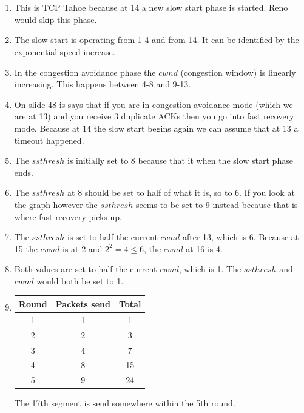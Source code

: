 \documentclass[12pt, a4paper]{article}
\begin{document}
\section{} %
\begin{enumerate}[a]
	\item %
	This is TCP Tahoe because at 14 a new slow start phase is started. Reno would skip this phase.
	\item %
	The slow start is operating from 1-4 and from 14. It can be identified by the exponential speed increase.
	\item %
	In the congestion avoidance phase the $cwnd$ (congestion window) is linearly increasing. This happens between 4-8 and 9-13.
	\item %
	On slide 48 is says that if you are in congestion avoidance mode (which we are at 13) and you receive 3 duplicate ACKs then you go into fast recovery mode. Because at 14 the slow start begins again we can assume that at 13 a timeout happened.
	\item %
	The $ssthresh$ is initially set to 8 because that it when the slow start phase ends.
	\item %
	The $ssthresh$ at 8 should be set to half of what it is, so to 6. If you look at the graph however the $ssthresh$ seems to be set to 9 instead because that is where fast recovery picks up.
	\item %
	The $ssthresh$ is set to half the current $cwnd$ after 13, which is $6$. Because at 15 the $cwnd$ is at 2 and $2^2 = 4 \leq 6$, the $cwnd$ at 16 is 4.
	\item %
	Both values are set to half the current $cwnd$, which is 1. The $ssthresh$ and $cwnd$ would both be set to 1.
	\item %
	\begin{tabular}{c|c|c}
		Round & Packets send & Total\\\hline
		1 & 1 & 1\\
		2 & 2 & 3\\
		3 & 4 & 7\\
		4 & 8 & 15\\
		5 & 9 & 24\\
	\end{tabular}

	The 17th segment is send somewhere within the 5th round.
\end{enumerate}
\end{document}
